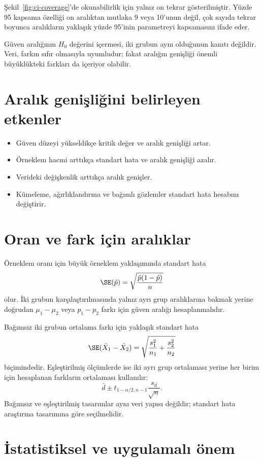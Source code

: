 Şekil~\ref{fig:ci-coverage}'de okunabilirlik için yalnız on tekrar gösterilmiştir.
Yüzde 95 kapsama
özelliği on aralıktan mutlaka 9 veya 10'unun değil, çok sayıda tekrar boyunca
aralıkların yaklaşık yüzde 95'inin parametreyi kapsamasını ifade eder.

\begin{mistakebox}
Güven aralığının $H_0$ değerini içermesi, iki grubun aynı olduğunun kanıtı
değildir. Veri, farkın sıfır olmasıyla uyumludur; fakat aralığın genişliği
önemli büyüklükteki farkları da içeriyor olabilir.
\end{mistakebox}

\section{Aralık genişliğini belirleyen etkenler}

\begin{itemize}
  \item Güven düzeyi yükseldikçe kritik değer ve aralık genişliği artar.
  \item Örneklem hacmi arttıkça standart hata ve aralık genişliği azalır.
  \item Verideki değişkenlik arttıkça aralık genişler.
  \item Kümeleme, ağırlıklandırma ve bağımlı gözlemler standart hata hesabını değiştirir.
\end{itemize}

\section{Oran ve fark için aralıklar}
\label{sec:ci-proportion-difference}

Örneklem oranı için büyük örneklem yaklaşımında standart hata
\[
\SE(\hat p)=\sqrt{\frac{\hat p(1-\hat p)}{n}}
\]
olur. İki grubun karşılaştırılmasında yalnız ayrı grup aralıklarına bakmak
yerine doğrudan $\mu_1-\mu_2$ veya $p_1-p_2$ farkı için güven aralığı
hesaplanmalıdır.

Bağımsız iki grubun ortalama farkı için yaklaşık standart hata
\[
\SE(\bar X_1-\bar X_2)
=\sqrt{\frac{s_1^2}{n_1}+\frac{s_2^2}{n_2}}
\]
biçimindedir. Eşleştirilmiş ölçümlerde ise iki ayrı grup ortalaması yerine
her birim için hesaplanan farkların ortalaması kullanılır:
\[
\bar d\pm t_{1-\alpha/2,n-1}\frac{s_d}{\sqrt n}.
\]
Bağımsız ve eşleştirilmiş tasarımlar aynı veri yapısı değildir; standart hata
araştırma tasarımına göre seçilmelidir.

\section{İstatistiksel ve uygulamalı önem}
\label{sec:ci-practical}

